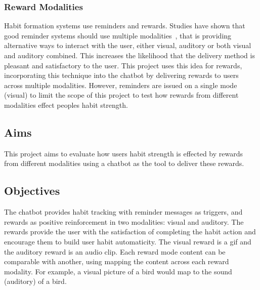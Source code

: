 \subsubsection*{Reward Modalities}
Habit formation systems use reminders and rewards.
Studies have shown that good reminder systems should use multiple modalities~\cite{article_designing_multimodal_reminders_for_home},
that is providing alternative ways to interact with the user, either visual, auditory or both visual and auditory combined.
This increases the likelihood that the delivery method is pleasant and satisfactory to the user.
This project uses this idea for rewards, incorporating this technique into the chatbot by delivering rewards to users across multiple modalities.
However, reminders are issued on a single mode (visual) to limit the scope of this project to test how rewards from different modalities effect peoples habit strength.

\subsection*{Aims}
This project aims to evaluate how users habit strength is effected by rewards from different modalities using a chatbot as the tool to deliver these rewards.

\subsection*{Objectives}
The chatbot provides habit tracking with reminder messages as triggers, and rewards as positive reinforcement in two modalities: visual and auditory.\newline
\newline
The rewards provide the user with the satisfaction of completing the habit action and encourage them to build user habit automaticity.
The visual reward is a gif and the auditory reward is an audio clip.
Each reward mode content can be comparable with another, using mapping the content across each reward modality.
For example, a visual picture of a bird would map to the sound (auditory) of a bird.

